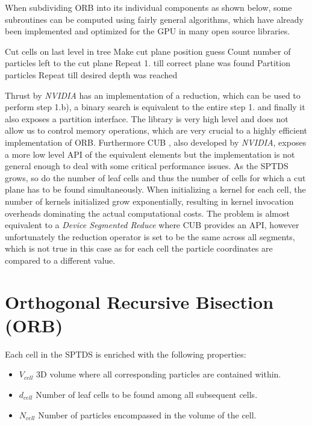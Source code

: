 \documentclass[]{article}
\begin{document}
When subdividing ORB into its individual components as shown below, some subroutines can be computed using fairly general algorithms, which have already been implemented and optimized for the GPU in many open source libraries. 

\begin{outline}[enumerate]
	\1 Cut cells on last level in tree
	\2 Make cut plane position guess
	\2 Count number of particles left to the cut plane
	\2 Repeat 1. till correct plane was found
	\1 Partition particles
	\1 Repeat till desired depth was reached
\end{outline}

Thrust by \textit{NVIDIA} \cite{thrust} has an implementation of a reduction, which can be used to perform step 1.b), a binary search is equivalent to the entire step 1. and finally it also exposes a partition interface. The library is very high level and does not allow us to control memory operations, which are very crucial to a highly efficient implementation of ORB. 
Furthermore CUB \cite{cub}, also developed by \textit{NVIDIA}, exposes a more low level API of the equivalent elements but the implementation is not general enough to deal with some critical performance issues. As the SPTDS grows, so do the number of leaf cells and thus the number of cells for which a cut plane has to be found simultaneously. When initializing a kernel for each cell, the number of kernels initialized grow exponentially, resulting in kernel invocation overheads dominating the actual computational costs. The problem is almost equivalent to a \textit{Device Segmented Reduce}\cite{cubSeg} where CUB provides an API, however unfortunately the reduction operator is set to be the same across all segments, which is not true in this case as for each cell the particle coordinates are compared to a different value. 


\newpage

\newpage
\section{Orthogonal Recursive Bisection (ORB)} \label{section:orb}


Each cell in the SPTDS is enriched with the following properties:

\begin{itemize}
	\item \textbf{$V_{cell}$} 3D volume where all corresponding particles are contained within.
	\item \textbf{$d_{cell}$} Number of leaf cells to be found among all subsequent cells.
	\item \textbf{$N_{cell}$} Number of particles encompassed in the volume of the cell. 
\end{itemize}
\end{document}
